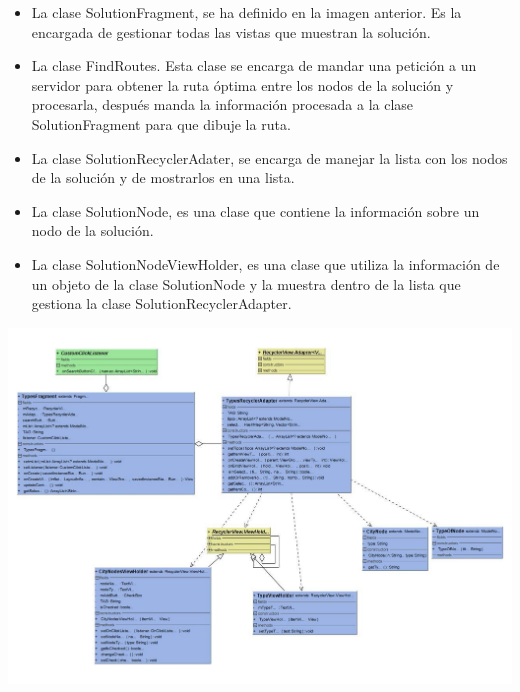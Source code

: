 \begin{itemize}
	\item La clase SolutionFragment, se ha definido en la imagen anterior. Es la encargada de gestionar todas las vistas que muestran la solución.
	\item La clase FindRoutes. Esta clase se encarga de mandar una petición a un servidor para obtener la ruta óptima entre los nodos de la solución y procesarla, después manda la información procesada a la clase SolutionFragment para que dibuje la ruta.
	\item La clase SolutionRecyclerAdater, se encarga de manejar la lista con los nodos de la solución y de mostrarlos en una lista.
	\item La clase SolutionNode, es una clase que contiene la información sobre un nodo de la solución.
	\item La clase SolutionNodeViewHolder, es una clase que utiliza la información de un objeto de la clase SolutionNode  y la muestra dentro de la lista que gestiona la clase SolutionRecyclerAdapter.
\end{itemize}
\thispagestyle{empty}
{%
	\label{fig:fragment_diagram}
	\centering
	\includegraphics[scale=.95,angle=90]{imagenes/fragment_class_diagram.pdf}
	\par
}
\restoregeometry

